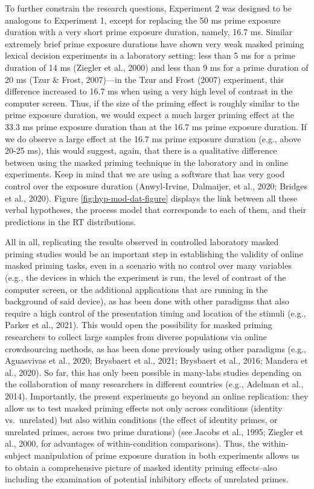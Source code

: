 \documentclass[
  english,
  man,floatsintext]{apa6}
\begin{document}
To further constrain the research questions, Experiment 2 was designed to be analogous to Experiment 1, except for replacing the 50 ms prime exposure duration with a very short prime exposure duration, namely, 16.7 ms. Similar extremely brief prime exposure durations have shown very weak masked priming lexical decision experiments in a laboratory setting: less than 5 ms for a prime duration of 14 ms (Ziegler et al., 2000) and less than 9 ms for a prime duration of 20 ms (Tzur \& Frost, 2007)---in the Tzur and Frost (2007) experiment, this difference increased to 16.7 ms when using a very high level of contrast in the computer screen. Thus, if the size of the priming effect is roughly similar to the prime exposure duration, we would expect a much larger priming effect at the 33.3 ms prime exposure duration than at the 16.7 ms prime exposure duration. If we do observe a large effect at the 16.7 ms prime exposure duration (e.g., above 20-25 ms), this would suggest, again, that there is a qualitative difference between using the masked priming technique in the laboratory and in online experiments. Keep in mind that we are using a software that has very good control over the exposure duration (Anwyl-Irvine, Dalmaijer, et al., 2020; Bridges et al., 2020). Figure \ref{fig:hyp-mod-dat-figure} displays the link between all these verbal hypotheses, the process model that corresponds to each of them, and their predictions in the RT distributions.

All in all, replicating the results observed in controlled laboratory masked priming studies would be an important step in establishing the validity of online masked priming tasks, even in a scenario with no control over many variables (e.g., the devices in which the experiment is run, the level of contrast of the computer screen, or the additional applications that are running in the background of said device), as has been done with other paradigms that also require a high control of the presentation timing and location of the stimuli (e.g., Parker et al., 2021). This would open the possibility for masked priming researchers to collect large samples from diverse populations via online crowdsourcing methods, as has been done previously using other paradigms (e.g., Aguasvivas et al., 2020; Brysbaert et al., 2021; Brysbaert et al., 2016; Mandera et al., 2020). So far, this has only been possible in many-labs studies depending on the collaboration of many researchers in different countries (e.g., Adelman et al., 2014). Importantly, the present experiments go beyond an online replication: they allow us to test masked priming effects not only across conditions (identity vs.~unrelated) but also within conditions (the effect of identity primes, or unrelated primes, across two prime durations) (see Jacobs et al., 1995; Ziegler et al., 2000, for advantages of within-condition comparisons). Thus, the within-subject manipulation of prime exposure duration in both experiments allows us to obtain a comprehensive picture of masked identity priming effects--also including the examination of potential inhibitory effects of unrelated primes.
\end{document}
